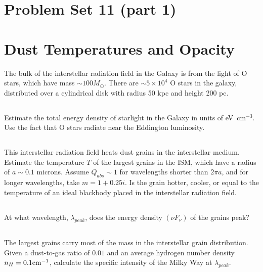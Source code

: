 \documentclass[11pt]{article}
\begin{document}
\pagestyle{empty}

\section*{\centering Problem Set 11 (part 1)}

\section{Dust Temperatures and Opacity}

The bulk of the interstellar radiation field in the Galaxy is from the light of
O stars, which have mass $\sim100M_\odot$.  There are $\sim5\times10^4$ O stars in the galaxy,
distributed over a cylindrical disk with radius 50 kpc and height 200 pc.

\subsection{}
Estimate the total energy density of starlight in the Galaxy in units of eV~cm$^{-3}$.
Use the fact that O stars radiate near the Eddington luminosity.

\subsection{}
This interstellar radiation field heats dust grains in the interstellar medium.
Estimate the temperature $T$ of the largest grains in the ISM, which have a radius
of $a\sim0.1$ microns.  Assume $Q_{abs}\sim1$ for wavelengths shorter than $2\pi a$,
and for longer wavelengths, take $m=1+0.25i$.
Is the grain hotter, cooler, or equal
to the temperature of an ideal blackbody placed in the interstellar radiation field.

\subsection{}
At what wavelength, $\lambda_{peak}$, does the energy density $(\nu F_\nu)$ of the grains peak?

\subsection{}
The largest grains carry most of the mass in the interstellar grain distribution.
Given a dust-to-gas ratio of $0.01$ and an average hydrogen number density
$n_H=0.1 {\rm cm}^{-1}$, calculate the specific intensity of the Milky Way
at $\lambda_{peak}$.
\end{document}
